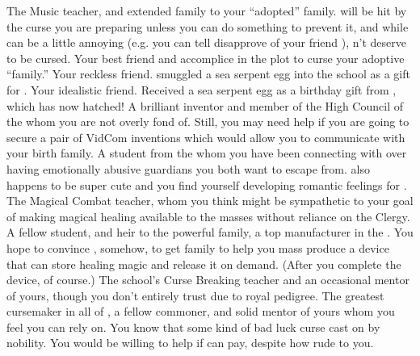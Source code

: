 \documentclass[char]{GL2020}
\begin{document}
\begin{contacts}
    \contact{\cMusic{}} The Music teacher, and extended family to your ``adopted'' family. \cMusic{\They} will be hit by the curse you are preparing unless you can do something to prevent it, and while \cMusic{} can be a little annoying (e.g. you can tell \cMusic{\they} disapprove of your friend \cLibAssist{}), \cMusic{\theydo}n't deserve to be cursed.
    \contact{\cLibAssist{}} Your best friend and accomplice in the plot to curse your adoptive “family.”
    \contact{\cPirateChild{}} Your reckless \pShippie{} friend. \cPirateChild{\They} smuggled a sea serpent egg into the school as a gift for \cDisney{}.
    \contact{\cDisney{}} Your idealistic \cDisney{\cleric} friend. Received a sea serpent egg as a birthday gift from \cPirateChild{}, which has now hatched!
    \contact{\cTechStar{}} A brilliant inventor and member of the High Council of the \pTech{} whom you are not overly fond of. Still, you may need \cTechStar{\their} help if you are going to secure a pair of \cTechStar{\their} VidCom inventions which would allow you to communicate with your birth family. 
    \contact{\cScholarship{}} A student from the \pTech{} whom you have been connecting with over having emotionally abusive guardians you both want to escape from. \cScholarship{\They} also happens to be super cute and you find yourself developing romantic feelings for \cScholarship{\them}.
    \contact{\cInterpol{}} The Magical Combat teacher, whom you think might be sympathetic to your goal of making magical healing available to the masses without reliance on the Clergy.
    \contact{\cHeir{}} A fellow student, and heir to the powerful \cHeir{\formal} family, a top manufacturer in the \pTech{}. You hope to convince \cHeir{}, somehow, to get \cHeir{\their} family to help you mass produce a device that can store healing magic and release it on demand. (After you complete the device, of course.)
    \contact{\cPrince{}} The school's Curse Breaking teacher and an occasional mentor of yours, though you don't entirely trust \cPrince{\them} due to \cPrince{\their} royal pedigree. 
    \contact{\cCurse{}} The greatest cursemaker in all of \pEarth{}, a fellow commoner, and solid mentor of yours whom you feel you can rely on. 
    \contact {\cInitiate{}} You know that \cInitiate{\they} \cInitiate{\has} some kind of bad luck curse cast on \cInitiate{\them} by \pFarm{} nobility. You would be willing to help if \cInitiate{\they} can pay, despite how rude \cInitiate{\theywere} to you.
\end{contacts}
\end{document}
